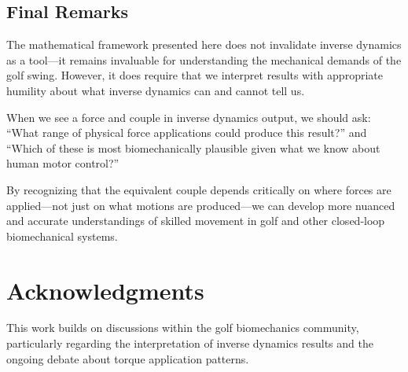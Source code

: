 \documentclass[11pt,a4paper]{article}
\begin{document}
\subsection{Final Remarks}

The mathematical framework presented here does not invalidate inverse dynamics as a tool—it remains invaluable for understanding the mechanical demands of the golf swing. However, it does require that we interpret results with appropriate humility about what inverse dynamics can and cannot tell us.

When we see a force and couple in inverse dynamics output, we should ask: ``What range of physical force applications could produce this result?'' and ``Which of these is most biomechanically plausible given what we know about human motor control?'' 

By recognizing that the equivalent couple depends critically on where forces are applied—not just on what motions are produced—we can develop more nuanced and accurate understandings of skilled movement in golf and other closed-loop biomechanical systems.

\section*{Acknowledgments}

This work builds on discussions within the golf biomechanics community, particularly regarding the interpretation of inverse dynamics results and the ongoing debate about torque application patterns.
\end{document}
